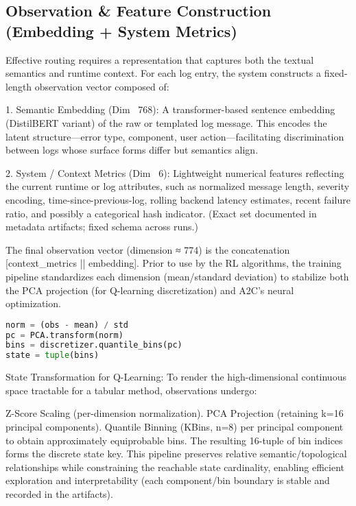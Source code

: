 \subsection{Observation \& Feature Construction (Embedding + System Metrics)}\label{subsec:observation-feature-construction}


Effective routing requires a representation that captures both the textual semantics and runtime context. For each log entry, the system constructs a fixed-length observation vector composed of:

1. Semantic Embedding (Dim ~768): A transformer-based sentence embedding (DistilBERT variant) of the raw or templated log message. This encodes the latent structure—error type, component, user action—facilitating discrimination between logs whose surface forms differ but semantics align.

2. System / Context Metrics (Dim ~6): Lightweight numerical features reflecting the current runtime or log attributes, such as normalized message length, severity encoding, time-since-previous-log, rolling backend latency estimates, recent failure ratio, and possibly a categorical hash indicator. (Exact set documented in metadata artifacts; fixed schema across runs.)

The final observation vector (dimension ≈ 774) is the concatenation [context\_metrics || embedding]. Prior to use by the RL algorithms, the training pipeline standardizes each dimension (mean/standard deviation) to stabilize both the PCA projection (for Q-learning discretization) and A2C’s neural optimization.

\begin{lstlisting}[language=Python, caption={State Discretization}]
norm = (obs - mean) / std
pc = PCA.transform(norm)
bins = discretizer.quantile_bins(pc)
state = tuple(bins)
\end{lstlisting}

State Transformation for Q-Learning: To render the high-dimensional continuous space tractable for a tabular method, observations undergo:

Z-Score Scaling (per-dimension normalization).
PCA Projection (retaining k=16 principal components).
Quantile Binning (KBins, n=8) per principal component to obtain approximately equiprobable bins.
The resulting 16-tuple of bin indices forms the discrete state key. This pipeline preserves relative semantic/topological relationships while constraining the reachable state cardinality, enabling efficient exploration and interpretability (each component/bin boundary is stable and recorded in the artifacts).


